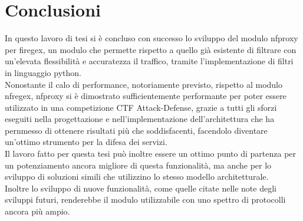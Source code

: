 \chapter*{Conclusioni}

In questo lavoro di tesi si è concluso con successo lo sviluppo del modulo nfproxy per firegex, un modulo che permette
rispetto a quello già esistente di filtrare con un'elevata flessibilità e accuratezza il traffico, tramite l'implementazione di
filtri in linguaggio python.\\

Nonostante il calo di performance, notoriamente previsto, rispetto al modulo nfregex, nfproxy si è dimostrato sufficientemente performante
per poter essere utilizzato in una competizione CTF Attack-Defense, grazie a tutti gli sforzi eseguiti nella progettazione e nell'implementazione
dell'architettura che ha pernmesso di ottenere risultati più che soddisfacenti, facendolo diventare un'ottimo strumento per la difesa dei servizi.\\

Il lavoro fatto per questa tesi può inoltre essere un ottimo punto di partenza per un potenziamento ancora migliore di questa funzionalità,
ma anche per lo sviluppo di soluzioni simili che utilizzino lo stesso modello architetturale.\\

Inoltre lo sviluppo di nuove funzionalità, come quelle citate nelle note degli sviluppi futuri, renderebbe il modulo utilizzabile con uno spettro di protocolli
ancora più ampio.

